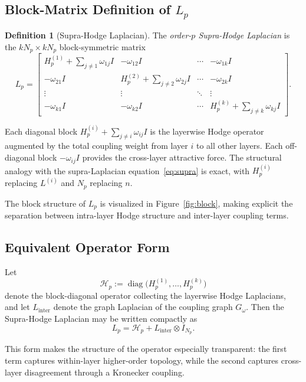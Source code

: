 \documentclass[11pt]{article}
\theoremstyle{definition}
\newtheorem{definition}[theorem]{Definition}
\theoremstyle{remark}
\newcommand{\Gom}{G_\omega}
\DeclareMathOperator{\diag}{diag}
\begin{document}
\subsection{Block-Matrix Definition of $L_p$}

\begin{definition}[Supra-Hodge Laplacian]
\label{def:main}
The \emph{order-$p$ Supra-Hodge Laplacian} is the $kN_p\times kN_p$
block-symmetric matrix
\begin{equation}
  \label{eq:Lp}
  L_p =
  \begin{bmatrix}
    H_p^{(1)} + \textstyle\sum_{j\neq 1}\omega_{1j}I & -\omega_{12}I & \cdots & -\omega_{1k}I\\
    -\omega_{21}I & H_p^{(2)} + \textstyle\sum_{j\neq 2}\omega_{2j}I & \cdots & -\omega_{2k}I\\
    \vdots & \vdots & \ddots & \vdots\\
    -\omega_{k1}I & -\omega_{k2}I & \cdots & H_p^{(k)} + \textstyle\sum_{j\neq k}\omega_{kj}I
  \end{bmatrix}.
\end{equation}
\end{definition}

Each diagonal block $H_p^{(i)}+\sum_{j\neq i}\omega_{ij}I$ is the layerwise
Hodge operator augmented by the total coupling weight from layer $i$ to all
other layers. Each off-diagonal block $-\omega_{ij}I$ provides the cross-layer
attractive force. The structural analogy with the supra-Laplacian
equation~\eqref{eq:supra} is exact, with $H_p^{(i)}$ replacing $L^{(i)}$ and
$N_p$ replacing $n$.

The block structure of $L_p$ is visualized in Figure~\ref{fig:block}, making
explicit the separation between intra-layer Hodge structure and inter-layer
coupling terms.

\FigureAFour

\subsection{Equivalent Operator Form}

Let
\[
\mathcal{H}_p := \diag\!\bigl(H_p^{(1)},\dots,H_p^{(k)}\bigr)
\]
denote the block-diagonal operator collecting the layerwise Hodge Laplacians, and let $L_{\mathrm{inter}}$ denote the graph Laplacian of the coupling graph $\Gom$. Then the Supra-Hodge Laplacian may be written compactly as
\[
L_p = \mathcal{H}_p + L_{\mathrm{inter}} \otimes I_{N_p}.
\]

This form makes the structure of the operator especially transparent: the first term captures within-layer higher-order topology, while the second captures cross-layer disagreement through a Kronecker coupling.
\end{document}
